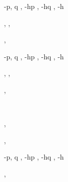 \documentclass[a4paper]{article}
\begin{document}
\begin{alectryon}
\begin{sentence}
\begin{output}
\begin{goals}
        \begin{goal}
          \begin{hyps}
            \hyp{p, q}{}
            \sep
            \hyp{hp}{}
            \sep
            \hyp{hq}{}
            \sep
            \hyp{h}{~~}
          \end{hyps}
          \sep
          \sep
          \begin{conclusion}
          \end{conclusion}
        \end{goal}
        \sep
        \begin{extragoals}
          \begin{goal}
            \begin{hyps}
              \hyp{p, q}{}
              \sep
              \hyp{hp}{}
              \sep
              \hyp{hq}{}
              \sep
              \hyp{h}{~~}
            \end{hyps}
            \sep
            \sep
            \begin{conclusion}
            \end{conclusion}
          \end{goal}
        \end{extragoals}
      \end{goals}
    \end{output}
  \end{sentence}
  \sep
  \begin{txt}
    \nl
    ~~~~
  \end{txt}
  \sep
  \begin{sentence}
    \begin{input}
    \end{input}
    \sep
    \begin{output}
      \begin{goals}
        \begin{goal}
          \begin{hyps}
            \hyp{p, q}{}
            \sep
            \hyp{hp}{}
            \sep
            \hyp{hq}{}
            \sep
            \hyp{h}{~~}
          \end{hyps}
          \sep

\end{goal}
\end{goals}
\end{output}
\end{sentence}
\end{alectryon}
\end{document}

